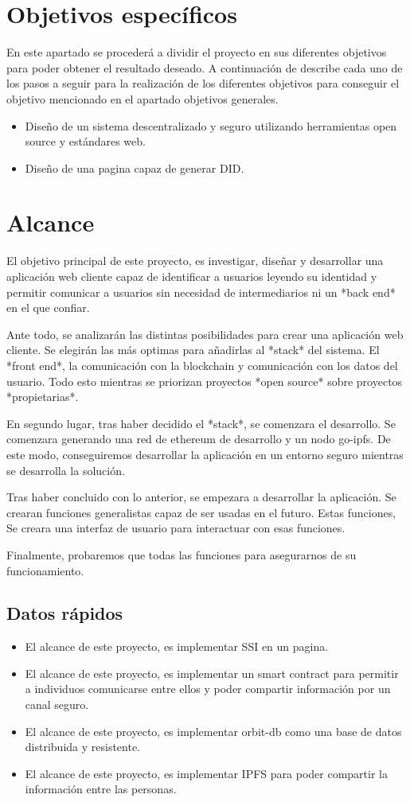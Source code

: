 \section{Objetivos específicos}
En este apartado se procederá a dividir el proyecto en sus diferentes objetivos para poder
obtener el resultado deseado. A continuación de describe cada uno de los pasos a seguir para la realización de los diferentes objetivos para conseguir el objetivo mencionado en el apartado objetivos generales.
\begin{itemize}
    \item Diseño de un sistema descentralizado y seguro utilizando herramientas open source y estándares web.
    \item Diseño de una pagina capaz de generar DID.
\end{itemize}
\section{Alcance}
El objetivo principal de este proyecto, es investigar, diseñar y desarrollar una aplicación web cliente capaz de identificar a usuarios leyendo su identidad y permitir comunicar a usuarios sin necesidad de intermediarios ni un *back end* en el que confiar.

Ante todo, se analizarán las distintas posibilidades para crear una aplicación web cliente. Se elegirán las más optimas para añadirlas al *stack* del sistema. El *front end*, la comunicación con la blockchain y comunicación con los datos del usuario. Todo esto mientras se priorizan proyectos *open source* sobre proyectos *propietarias*.

En segundo lugar, tras haber decidido el *stack*, se comenzara el desarrollo. Se comenzara generando una red de ethereum de desarrollo y un nodo go-ipfs. De este modo, conseguiremos desarrollar la aplicación en un entorno seguro mientras se desarrolla la solución.

Tras haber concluido con lo anterior, se empezara a desarrollar la aplicación. Se crearan funciones generalistas capaz de ser usadas en el futuro. Estas funciones,  Se creara una interfaz de usuario para interactuar con esas funciones.

Finalmente, probaremos que todas las funciones para asegurarnos de su funcionamiento.
\subsection{Datos rápidos}
\begin{itemize}
    \item El alcance de este proyecto, es implementar SSI en un pagina.
    \item El alcance de este proyecto, es implementar un smart contract para permitir a individuos comunicarse entre ellos y poder compartir información por un canal seguro.
    \item El alcance de este proyecto, es implementar orbit-db como una base de datos distribuida y resistente.
    \item El alcance de este proyecto, es implementar IPFS \cite{web:ipfs} para poder compartir la información entre las personas.
\end{itemize}
